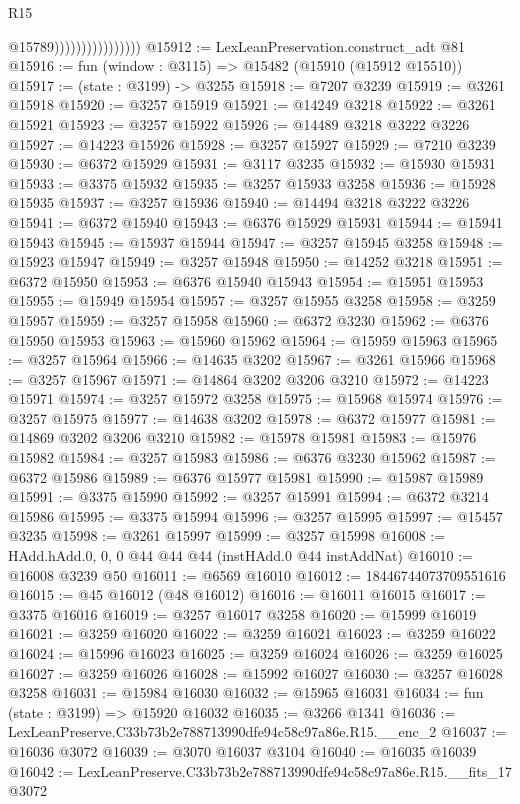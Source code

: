 \begin{lexlean}{R15}
\begin{coremodule}
                                    @15789))))))))))))))))
@15912 := LexLeanPreservation.construct_adt @81
@15916 := fun (window : @3115) => @15482 (@15910 (@15912 @15510))
@15917 := (state : @3199) -> @3255
@15918 := @7207 @3239
@15919 := @3261 @15918
@15920 := @3257 @15919
@15921 := @14249 @3218
@15922 := @3261 @15921
@15923 := @3257 @15922
@15926 := @14489 @3218 @3222 @3226
@15927 := @14223 @15926
@15928 := @3257 @15927
@15929 := @7210 @3239
@15930 := @6372 @15929
@15931 := @3117 @3235
@15932 := @15930 @15931
@15933 := @3375 @15932
@15935 := @3257 @15933 @3258
@15936 := @15928 @15935
@15937 := @3257 @15936
@15940 := @14494 @3218 @3222 @3226
@15941 := @6372 @15940
@15943 := @6376 @15929 @15931
@15944 := @15941 @15943
@15945 := @15937 @15944
@15947 := @3257 @15945 @3258
@15948 := @15923 @15947
@15949 := @3257 @15948
@15950 := @14252 @3218
@15951 := @6372 @15950
@15953 := @6376 @15940 @15943
@15954 := @15951 @15953
@15955 := @15949 @15954
@15957 := @3257 @15955 @3258
@15958 := @3259 @15957
@15959 := @3257 @15958
@15960 := @6372 @3230
@15962 := @6376 @15950 @15953
@15963 := @15960 @15962
@15964 := @15959 @15963
@15965 := @3257 @15964
@15966 := @14635 @3202
@15967 := @3261 @15966
@15968 := @3257 @15967
@15971 := @14864 @3202 @3206 @3210
@15972 := @14223 @15971
@15974 := @3257 @15972 @3258
@15975 := @15968 @15974
@15976 := @3257 @15975
@15977 := @14638 @3202
@15978 := @6372 @15977
@15981 := @14869 @3202 @3206 @3210
@15982 := @15978 @15981
@15983 := @15976 @15982
@15984 := @3257 @15983
@15986 := @6376 @3230 @15962
@15987 := @6372 @15986
@15989 := @6376 @15977 @15981
@15990 := @15987 @15989
@15991 := @3375 @15990
@15992 := @3257 @15991
@15994 := @6372 @3214 @15986
@15995 := @3375 @15994
@15996 := @3257 @15995
@15997 := @15457 @3235
@15998 := @3261 @15997
@15999 := @3257 @15998
@16008 := HAdd.hAdd.{0, 0, 0} @44 @44 @44 (instHAdd.{0} @44 instAddNat)
@16010 := @16008 @3239 @50
@16011 := @6569 @16010
@16012 := 18446744073709551616
@16015 := @45 @16012 (@48 @16012)
@16016 := @16011 @16015
@16017 := @3375 @16016
@16019 := @3257 @16017 @3258
@16020 := @15999 @16019
@16021 := @3259 @16020
@16022 := @3259 @16021
@16023 := @3259 @16022
@16024 := @15996 @16023
@16025 := @3259 @16024
@16026 := @3259 @16025
@16027 := @3259 @16026
@16028 := @15992 @16027
@16030 := @3257 @16028 @3258
@16031 := @15984 @16030
@16032 := @15965 @16031
@16034 := fun (state : @3199) => @15920 @16032
@16035 := @3266 @1341
@16036 := LexLeanPreserve.C33b73b2e788713990dfe94c58c97a86e.R15.__enc_2
@16037 := @16036 @3072
@16039 := @3070 @16037 @3104
@16040 := @16035 @16039
@16042 := LexLeanPreserve.C33b73b2e788713990dfe94c58c97a86e.R15.__fits_17 @3072

\end{coremodule}
\end{lexlean}
